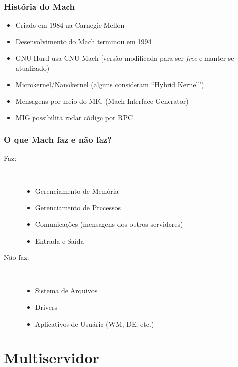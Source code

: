 \documentclass[10pt]{beamer}
\theoremstyle{plain}
\begin{document}
\begin{frame}
  \frametitle{História do Mach}
  \begin{itemize}
    \item Criado em 1984 na Carnegie-Mellon
    \item Desenvolvimento do Mach terminou em 1994
    \item GNU Hurd usa GNU Mach (versão modificada para ser \textit{free} e manter-se atualizado)
    \item Microkernel/Nanokernel (alguns consideram ``Hybrid Kernel'')
    \item Mensagens por meio do MIG (Mach Interface Generator)
    \item MIG possibilita rodar código por RPC
  \end{itemize}
\end{frame}

\begin{frame}
  \frametitle{O que Mach faz e não faz?}
  \begin{description}
    \item[Faz:]~\\
      \begin{itemize}
        \item Gerenciamento de Memória
        \item Gerenciamento de Processos
        \item Comunicações (mensagens dos outros servidores)
        \item Entrada e Saída
      \end{itemize}
    \item [Não faz:]~\\
      \begin{itemize}
        \item Sistema de Arquivos
        \item Drivers
        \item Aplicativos de Usuário (WM, DE, etc.)
      \end{itemize}
  \end{description}
\end{frame}

\section{Multiservidor}
\end{document}
